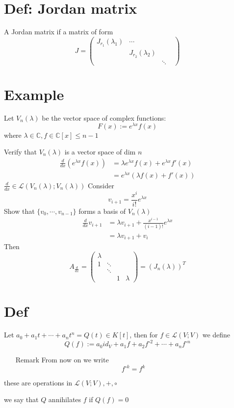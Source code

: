 \documentclass{book}
\begin{document}
\section{Def: Jordan matrix}
A Jordan matrix if a matrix of form
$$J=\begin{pmatrix}
    J_{r_1}(\lambda_1)&\cdots&\\
    &J_{r_2}(\lambda_2)&&\\
    &&\ddots&
\end{pmatrix}$$
\section{Example}
Let $V_n(\lambda)$ be the vector space of complex functions:
$$F(x):=e^{\lambda x}f(x)$$ where $\lambda\in \mathbb{C},f\in \mathbb{C}[x]\leq n-1$

Verify that $V_n(\lambda)$ is a vector space of dim $n$
$$\begin{aligned}
    \frac{d}{dx}(e^{\lambda x} f(x)) &=\lambda e^{\lambda x}f(x)+e^{\lambda x}f'(x)\\ &=e^{\lambda x}(\lambda f(x)+f'(x))
\end{aligned}$$
$\frac{d}{dx}\in\mathscr{L}(V_n(\lambda);V_n(\lambda))$ Consider$$v_{i+1}=\frac{x^i}{i!}e^{\lambda x}$$
Show that $\{v_0,\cdots,v_{n-1}\}$ forms a basis of $V_n(\lambda)$
$$\begin{aligned}
    \frac{d}{dx}v_{i+1} &=\lambda v_{i+1}+\frac{x^{i-1}}{(i-1)!}e^{\lambda x}\\ &=\lambda v_{i+1}+v_i
\end{aligned}$$
Then 
$$A_{\frac{d}{dx}}=\begin{pmatrix}
    \lambda& & &\\
    1&\ddots&&\\
    &\ddots&&\\
    &&1&\lambda
\end{pmatrix}=(J_n(\lambda))^T$$
\section{Def}
Let $a_0+a_1t+\cdots+a_nt^n= Q(t)\in K[t]$, then for $f\in \mathscr{L}(V;V)$ we define 
$$Q(f):=a_0id_V+a_1f+a_2f^{\circ 2}+\cdots+a_nf^{\circ n}$$
\begin{itemize}
    \item[Remark]
From now on we write
$$f^{\circ k}=f^k$$
\end{itemize}
these are operations in $\mathscr{L}(V;V),+,\circ$

we say that $Q$ annihilates $f$ if $Q(f)=0$
\end{document}
